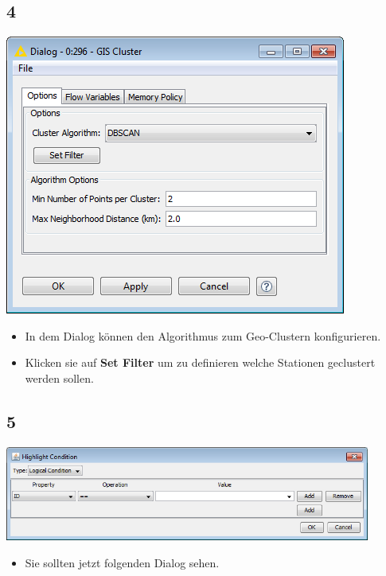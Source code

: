 \documentclass{beamer}
\begin{document}
\subsection{4}
\begin{frame}
	\begin{center}
  		\includegraphics[height=0.6\textheight]{4.png}
	\end{center}
	\begin{itemize}
		\item In dem Dialog können den Algorithmus zum Geo-Clustern konfigurieren.
		\item Klicken sie auf \textbf{Set Filter} um zu definieren welche Stationen geclustert werden sollen.
	\end{itemize}
\end{frame}

\subsection{5}
\begin{frame}
	\begin{center}
  		\includegraphics[width=0.9\textwidth]{5.png}
	\end{center}
	\begin{itemize}
		\item Sie sollten jetzt folgenden Dialog sehen.
	\end{itemize}
\end{frame}
\end{document}
